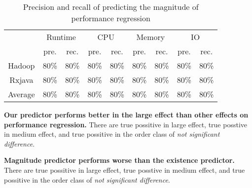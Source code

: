 \begin{table}[]
	\centering
	\footnotesize
	\caption{Precision and recall of predicting the magnitude of performance regression}
	\label{tab:ordinal}
	\begin{tabular}{|c|c|r|c|r|c|r|c|r|}
		\hline
		\multirow{2}{*}{}             & \multicolumn{2}{c|}{Runtime}                          & \multicolumn{2}{c|}{CPU}                              & \multicolumn{2}{c|}{Memory}                           & \multicolumn{2}{c|}{IO}                               \\ \cline{2-9} 
		& pre.                      & \multicolumn{1}{c|}{rec.} & pre.                      & \multicolumn{1}{c|}{rec.} & pre.                      & \multicolumn{1}{c|}{rec.} & pre.                      & \multicolumn{1}{c|}{rec.} \\ \hline
		Hadoop                        & \multicolumn{1}{r|}{80\%} & 80\%                      & \multicolumn{1}{r|}{80\%} & 80\%                      & \multicolumn{1}{r|}{80\%} & 80\%                      & \multicolumn{1}{r|}{80\%} & 80\%                      \\ \hline
		Rxjava                        & \multicolumn{1}{r|}{80\%} & 80\%                      & \multicolumn{1}{r|}{80\%} & 80\%                      & \multicolumn{1}{r|}{80\%} & 80\%                      & \multicolumn{1}{r|}{80\%} & 80\%                      \\ \hline
		\multicolumn{1}{|l|}{Average} & \multicolumn{1}{l|}{80\%} & \multicolumn{1}{l|}{80\%} & \multicolumn{1}{l|}{80\%} & \multicolumn{1}{l|}{80\%} & \multicolumn{1}{l|}{80\%} & \multicolumn{1}{l|}{80\%} & \multicolumn{1}{l|}{80\%} & \multicolumn{1}{l|}{80\%} \\ \hline
	\end{tabular}
\end{table}

\textbf{Our predictor performs better in the large effect than other effects on performance regression.} There are  true possitive in large effect,  true posstive in medium effect, and  true possitive in the order class of \emph{not significant difference}.

\textbf{Magnitude predictor performs worse than the existence predictor.} There are  true possitive in large effect,  true posstive in medium effect, and  true possitive in the order class of \emph{not significant difference}.

